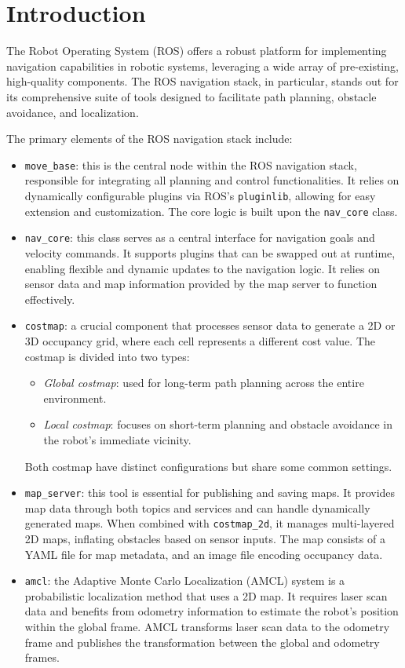 \section{Introduction}

The Robot Operating System (ROS) offers a robust platform for implementing navigation capabilities in robotic systems, leveraging a wide array of pre-existing, high-quality components. 
The ROS navigation stack, in particular, stands out for its comprehensive suite of tools designed to facilitate path planning, obstacle avoidance, and localization.

The primary elements of the ROS navigation stack include:
\begin{itemize}
    \item \texttt{move\_base}: this is the central node within the ROS navigation stack, responsible for integrating all planning and control functionalities. 
        It relies on dynamically configurable plugins via ROS's  \texttt{pluginlib}, allowing for easy extension and customization.
        The core logic is built upon the \texttt{nav\_core} class. 
    \item \texttt{nav\_core}: this class serves as a central interface for navigation goals and velocity commands. 
        It supports plugins that can be swapped out at runtime, enabling flexible and dynamic updates to the navigation logic. 
        It relies on sensor data and map information provided by the map server to function effectively.
    \item \texttt{costmap}: a crucial component that processes sensor data to generate a 2D or 3D occupancy grid, where each cell represents a different cost value. 
        The costmap is divided into two types:
        \begin{itemize}
            \item \textit{Global costmap}: used for long-term path planning across the entire environment.
            \item \textit{Local costmap}: focuses on short-term planning and obstacle avoidance in the robot's immediate vicinity.
        \end{itemize}
        Both costmap have distinct configurations but share some common settings.
    \item \texttt{map\_server}: this tool is essential for publishing and saving maps. 
        It provides map data through both topics and services and can handle dynamically generated maps. 
        When combined with \texttt{costmap\_2d}, it manages multi-layered 2D maps, inflating obstacles based on sensor inputs. 
        The map consists of a YAML file for map metadata, and an image file encoding occupancy data.
    \item \texttt{amcl}: the Adaptive Monte Carlo Localization (AMCL) system is a probabilistic localization method that uses a 2D map.
        It requires laser scan data and benefits from odometry information to estimate the robot's position within the global frame. 
        AMCL transforms laser scan data to the odometry frame and publishes the transformation between the global and odometry frames.
\end{itemize}

